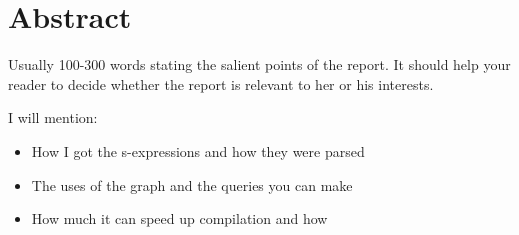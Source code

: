 
\chapter*{Abstract}

Usually 100-300 words stating the salient points of the report. It should help your reader
to decide whether the report is relevant to her or his interests.


I will mention:
\begin{itemize}
\item How I got the s-expressions and how they were parsed
\item The uses of the graph and the queries you can make 
\item How much it can speed up compilation and how
\end{itemize}
